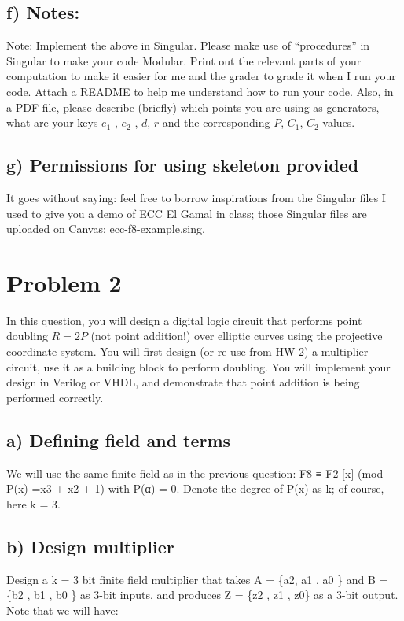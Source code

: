 \documentclass[a4paper,11pt]{exam}
\begin{document}
\subsection{f) Notes:}
\label{sec:org31b246e}
Note: Implement the above in Singular. Please make use of “procedures” in Singular to make your code Modular. Print out the relevant parts of your computation to make it easier for me and  the grader  to grade it when I run your code.  Attach a README to help me understand how to run your code.  Also,  in a PDF file, please  describe  (briefly)  which points you are using as generators, what are your keys \(e_1\) , \(e_2\) , \(d\), \(r\) and the corresponding \(P\), \(C_1\), \(C_2\) values. 

\subsection{g) Permissions for using skeleton provided}
\label{sec:org4917ef0}
It goes without saying: feel free to borrow inspirations from the Singular files I used to give you a demo of ECC El Gamal in class; those Singular files are uploaded on Canvas: ecc-f8-example.sing.


\section{Problem 2}
\label{sec:org71c5f93}
In this question, you will design a digital logic circuit that performs point doubling \(R = 2P\)  (not point addition!) over elliptic curves using the projective coordinate system. You will first design (or re-use from HW 2) a multiplier circuit, use it as a building block to perform doubling. You will implement your design in Verilog or VHDL, and demonstrate that point addition is being performed correctly.

\subsection{a) Defining field and terms}
\label{sec:orgcc28b5d}
We will use the same finite field as in the previous question: F8 ≡ F2 [x] (mod P(x) =x3 + x2 + 1) with P(α) = 0. Denote the degree of P(x) as k; of course, here k = 3.

\subsection{b) Design multiplier}
\label{sec:org150f9d5}
Design a k = 3 bit finite field multiplier that takes A = \{a2, a1 , a0 \} and B = \{b2 , b1 , b0 \} as 3-bit inputs, and produces Z = \{z2 , z1 , z0\} as a 3-bit output. Note that we will have:
\end{document}
